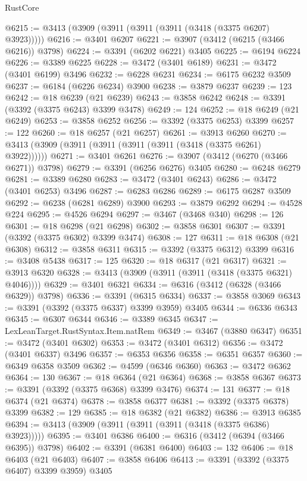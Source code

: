 \begin{lexlean}{RustCore}
\begin{coremodule}
@6215 := @3413 (@3909 (@3911 (@3911 (@3911 (@3418 (@3375 @6207) @3923)))))
@6216 := @3401 @6207
@6221 := @3907 (@3412 (@6215 (@3466 @6216)) @3798)
@6224 := @3391 (@6202 @6221) @3405
@6225 := @6194 @6224
@6226 := @3389 @6225
@6228 := @3472 (@3401 @6189)
@6231 := @3472 (@3401 @6199) @3496
@6232 := @6228 @6231
@6234 := @6175 @6232 @3509
@6237 := @6184 (@6226 @6234) @3900
@6238 := @3879 @6237
@6239 := 123
@6242 := @18 @6239 (@21 @6239)
@6243 := @3858 @6242
@6248 := @3391 (@3392 (@3375 @6243) @3399 @3478)
@6249 := 124
@6252 := @18 @6249 (@21 @6249)
@6253 := @3858 @6252
@6256 := @3392 (@3375 @6253) @3399
@6257 := 122
@6260 := @18 @6257 (@21 @6257)
@6261 := @3913 @6260
@6270 := @3413 (@3909 (@3911 (@3911 (@3911 (@3911 (@3418 (@3375 @6261) @3922))))))
@6271 := @3401 @6261
@6276 := @3907 (@3412 (@6270 (@3466 @6271)) @3798)
@6279 := @3391 (@6256 @6276) @3405
@6280 := @6248 @6279
@6281 := @3389 @6280
@6283 := @3472 (@3401 @6243)
@6286 := @3472 (@3401 @6253) @3496
@6287 := @6283 @6286
@6289 := @6175 @6287 @3509
@6292 := @6238 (@6281 @6289) @3900
@6293 := @3879 @6292
@6294 := @4528 @224
@6295 := @4526 @6294
@6297 := @3467 (@3468 @340)
@6298 := 126
@6301 := @18 @6298 (@21 @6298)
@6302 := @3858 @6301
@6307 := @3391 (@3392 (@3375 @6302) @3399 @3474)
@6308 := 127
@6311 := @18 @6308 (@21 @6308)
@6312 := @3858 @6311
@6315 := @3392 (@3375 @6312) @3399
@6316 := @3408 @5438
@6317 := 125
@6320 := @18 @6317 (@21 @6317)
@6321 := @3913 @6320
@6328 := @3413 (@3909 (@3911 (@3911 (@3418 (@3375 @6321) @4046))))
@6329 := @3401 @6321
@6334 := @6316 (@3412 (@6328 (@3466 @6329)) @3798)
@6336 := @3391 (@6315 @6334)
@6337 := @3858 @3069
@6343 := @3391 (@3392 (@3375 @6337) @3399 @3959) @3405
@6344 := @6336 @6343
@6345 := @6307 @6344
@6346 := @3389 @6345
@6347 := LexLeanTarget.RustSyntax.Item.natRem
@6349 := @3467 (@3880 @6347)
@6351 := @3472 (@3401 @6302)
@6353 := @3472 (@3401 @6312)
@6356 := @3472 (@3401 @6337) @3496
@6357 := @6353 @6356
@6358 := @6351 @6357
@6360 := @6349 @6358 @3509
@6362 := @4599 (@6346 @6360)
@6363 := @3472 @6362
@6364 := 130
@6367 := @18 @6364 (@21 @6364)
@6368 := @3858 @6367
@6373 := @3391 (@3392 (@3375 @6368) @3399 @3476)
@6374 := 131
@6377 := @18 @6374 (@21 @6374)
@6378 := @3858 @6377
@6381 := @3392 (@3375 @6378) @3399
@6382 := 129
@6385 := @18 @6382 (@21 @6382)
@6386 := @3913 @6385
@6394 := @3413 (@3909 (@3911 (@3911 (@3911 (@3418 (@3375 @6386) @3923)))))
@6395 := @3401 @6386
@6400 := @6316 (@3412 (@6394 (@3466 @6395)) @3798)
@6402 := @3391 (@6381 @6400)
@6403 := 132
@6406 := @18 @6403 (@21 @6403)
@6407 := @3858 @6406
@6413 := @3391 (@3392 (@3375 @6407) @3399 @3959) @3405

\end{coremodule}
\end{lexlean}
